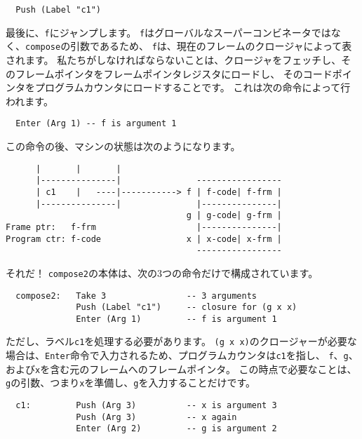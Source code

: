 \documentclass{jarticle}
\begin{document}
\begin{verbatim}
  Push (Label "c1")
\end{verbatim}

最後に、\texttt{f}にジャンプします。
\texttt{f}はグローバルなスーパーコンビネータではなく、\texttt{compose}の引数であるため、
\texttt{f}は、現在のフレームのクロージャによって表されます。
私たちがしなければならないことは、クロージャをフェッチし、そのフレームポインタをフレームポインタレジスタにロードし、
そのコードポインタをプログラムカウンタにロードすることです。
これは次の命令によって行われます。

\begin{verbatim}
  Enter (Arg 1) -- f is argument 1
\end{verbatim}

この命令の後、マシンの状態は次のようになります。

\begin{verbatim}
      |       |       |
      |---------------|               -----------------
      | c1    |   ----|-----------> f | f-code| f-frm |
      |---------------|               |---------------|
                                    g | g-code| g-frm |
Frame ptr:   f-frm                    |---------------|
Program ctr: f-code                 x | x-code| x-frm |
                                      -----------------
\end{verbatim}

それだ！
\texttt{compose2}の本体は、次の3つの命令だけで構成されています。

\begin{verbatim}
  compose2:   Take 3                -- 3 arguments
              Push (Label "c1")     -- closure for (g x x)
              Enter (Arg 1)         -- f is argument 1
\end{verbatim}

ただし、ラベル\texttt{c1}を処理する必要があります。
\texttt{(g x x)}のクロージャーが必要な場合は、\texttt{Enter}命令で入力されるため、プログラムカウンタは\texttt{c1}を指し、
\texttt{f}、\texttt{g}、および\texttt{x}を含む元のフレームへのフレームポインタ。
この時点で必要なことは、\texttt{g}の引数、つまり\texttt{x}を準備し、\texttt{g}を入力することだけです。

\begin{verbatim}
  c1:         Push (Arg 3)          -- x is argument 3
              Push (Arg 3)          -- x again
              Enter (Arg 2)         -- g is argument 2
\end{verbatim}
\end{document}
